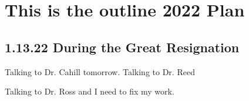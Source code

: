 \chapter{This is the outline 2022 Plan}
\section{1.13.22 During the Great Resignation}


Talking to Dr. Cahill tomorrow. 
Talking to Dr. Reed 

Talking to Dr. Ross and I need to fix my work. 
